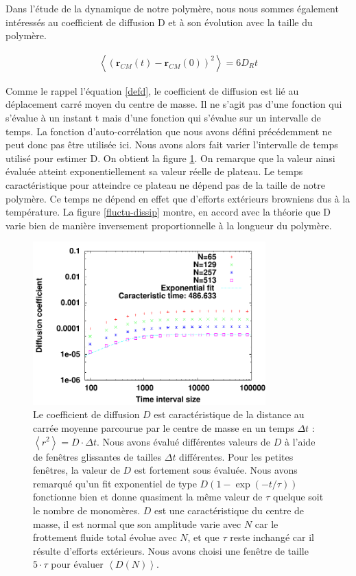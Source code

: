 Dans l'étude de la dynamique de notre polymère, nous nous sommes également intéressés au coefficient de diffusion D et à son évolution avec la taille du polymère.

\begin{eqnarray}
\left<(\textbf{r}_{CM}(t)-\textbf{r}_{CM}(0))^2\right>= 6 D_R t
\label{defd}
\end{eqnarray}

Comme le rappel l'équation \ref{defd}, le coefficient de diffusion est lié au déplacement carré moyen du centre de masse. Il ne s'agit pas d'une fonction qui s'évalue à un instant t mais d'une fonction qui s'évalue sur un intervalle de temps. La fonction d’auto-corrélation que nous avons défini précédemment ne peut donc pas être utilisée ici. Nous avons alors fait varier l'intervalle de temps utilisé pour estimer D. On obtient la figure \ref{dexptime}. On remarque que la valeur ainsi évaluée atteint exponentiellement sa valeur réelle de plateau. Le temps caractéristique pour atteindre ce plateau ne dépend pas de la taille de notre polymère. Ce temps ne dépend en effet que d'efforts extérieurs browniens dus à la température. La figure \ref{fluctu-dissip} montre, en accord avec la théorie que D varie bien de manière inversement proportionnelle à la longueur du polymère.

\begin{figure}[H]
\begin{center}
\includegraphics[width=0.8\textwidth]{dexptime.pdf}

\caption[Résultats numériques: estimation du coefficient de diffusion]{Le coefficient de diffusion $D$ est caractéristique de la distance au carrée moyenne parcourue par le centre de masse en un temps $\Delta t$ : $\left<r^2\right> =D\cdot \Delta t$. Nous avons évalué différentes valeurs de $D$ à l'aide de fenêtres glissantes de tailles $\Delta t$ différentes. Pour les petites fenêtres, la valeur de $D$ est fortement sous évaluée. Nous avons remarqué qu'un fit exponentiel de type $D\left(1-\exp\left(-t/\tau\right)\right)$ fonctionne bien et donne quasiment la même valeur de $\tau$ quelque soit le nombre de monomères. $D$ est une caractéristique du centre de masse, il est normal que son amplitude varie avec $N$ car le frottement fluide total évolue avec $N$, et que $\tau$ reste inchangé car il résulte d’efforts extérieurs. Nous avons choisi une fenêtre de taille $5\cdot \tau$ pour évaluer $\left<D(N)\right> $.}
\label{dexptime}
\end{center}
\end{figure}

